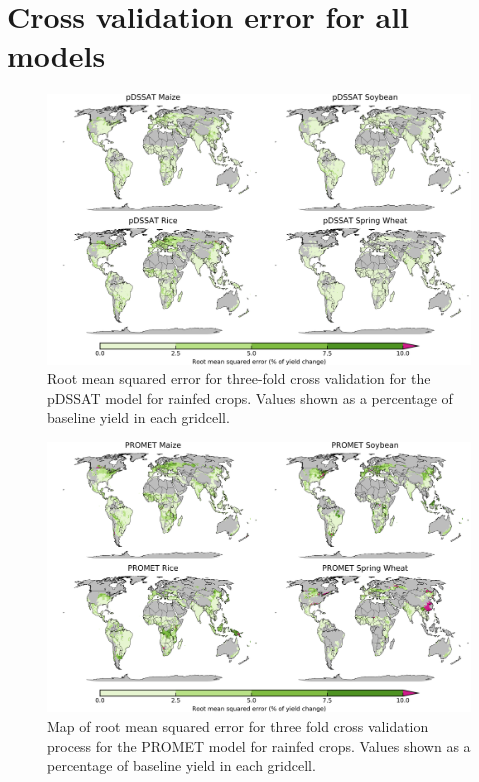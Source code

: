 \documentclass[10pt]{article}
\begin{document}
{{%
\clearpage
\section{Cross validation error for all models}

\begin{figure}[h!]
  \centering
  \includegraphics[width=15.5cm]{pDSSAT_spatial_MSE_ton_ha.png}
  \caption{Root mean squared error for three-fold cross validation for the pDSSAT model for rainfed crops. Values shown as a percentage of baseline yield in each gridcell.}
\end{figure}

\begin{figure}[h!]
  \centering
  \includegraphics[width=15.5cm]{PROMET_spatial_MSE_ton_ha.png}
  \caption{Map of root mean squared error for three fold cross validation process for the PROMET model for rainfed crops. Values shown as a percentage of baseline yield in each gridcell.}
\end{figure}

}}
\end{document}
